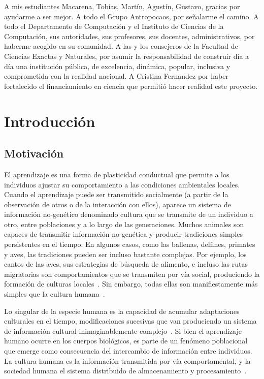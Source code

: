 \documentclass[a4paper,11pt]{book}
\makeatletter
\renewcommand{\mainmatter}{\cleardoublepage\@mainmattertrue}
\theoremstyle{definition}
\makeatother
\begin{document}
%
A mis estudiantes Macarena, Tob\'ias, Mart\'in, Agust\'in, Gustavo, gracias por ayudarme a ser mejor.
%
A todo el Grupo Antropocaos, por se\~nalarme el camino.
%
A todo el Departamento de Computaci\'on y el Instituto de Ciencias de la Computaci\'on, sus autoridades, sus profesores, sus docentes, administrativos, por haberme acogido en su comunidad.
%
A las y los consejeros de la Facultad de Ciencias Exactas y Naturales, por asumir la responsabilidad de construir d\'ia a d\'ia una instituci\'on p\'ublica, de excelencia, din\'amica, popular, inclusiva y comprometida con la realidad nacional.
%
A Cristina Fernandez por haber fortalecido el financiamiento en ciencia que permiti\'o hacer realidad este proyecto.








\mainmatter

\chapter{Introducci\'on} \label{ch_intro}

\section{Motivaci\'on}

El aprendizaje es una forma de plasticidad conductual que permite a los individuos ajustar su comportamiento a las condiciones ambientales locales.
%
Cuando el aprendizaje puede ser transmitido socialmente (a partir de la observaci\'on de otros o de la interacci\'on con ellos), aparece un sistema de informaci\'on no-gen\'etico denominado cultura que se transmite de un individuo a otro, entre poblaciones y a lo largo de las generaciones.
%
Muchos animales son capaces de transmitir informaci\'on no-gen\'etica y producir tradiciones simples persistentes en el tiempo.
%
En algunos casos, como las ballenas, delfines, primates y aves, las tradiciones pueden ser incluso bastante complejas.
%
Por ejemplo, los cantos de las aves, sus estrategias de b\'usqueda de alimento, e incluso las rutas migratorias son comportamientos que se transmiten por v\'ia social, produciendo la formaci\'on de culturas locales~\cite{aplin2022-birdsCulture}.
%
Sin embargo, todas ellas son manifiestamente m\'as simples que la cultura humana~\cite{boyd1996-whyCultureIsCommon}.


Lo singular de la especie humana es la capacidad de acumular adaptaciones culturales en el tiempo, modificaciones sucesivas que van produciendo un sistema de informaci\'on cultural inimaginablemente complejo~\cite{Tomasello1993, Boyd2011}.
%
Si bien el aprendizaje humano ocurre en los cuerpos biol\'ogicos, es parte de un fen\'omeno poblacional que emerge como consecuencia del intercambio de informaci\'on entre individuos.
%
La cultura humana es la informaci\'on transmitida por v\'ia comportamental, y la sociedad humana el sistema distribuido de almacenamiento y procesamiento~\cite{Derex2020}.
\end{document}
